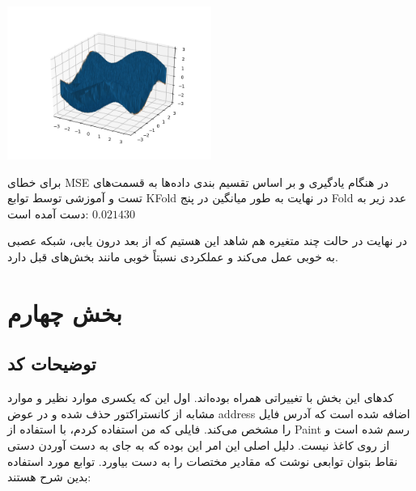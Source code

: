 \documentclass[12pt,titlepage,a4page , tikz , multi,table , svgnames,xcdraw]{article}
\begin{document}
\begin{center}

 \includegraphics[width=0.5\textwidth]{pictures/14.png}

\end{center}

برای خطای MSE در هنگام یادگیری و بر اساس تقسیم بندی داده‌ها به قسمت‌های تست و آموزشی توسط توابع KFold در نهایت به طور میانگین در پنج Fold عدد زیر به دست آمده است:
$ 0.021430$


\hrulefill

در نهایت در حالت چند متغیره هم شاهد این هستیم که از بعد درون یابی، شبکه عصبی به خوبی عمل می‌کند و عملکردی نسبتاً خوبی مانند بخش‌های قبل دارد.


\newpage

\section{بخش چهارم}
\subsection{توضیحات کد}
کدهای این بخش با تغییراتی همراه بوده‌اند. اول این که یکسری موارد نظیر  و موارد مشابه از کانستراکتور حذف شده و در عوض address اضافه شده است که آدرس فایل را مشخص می‌کند. فایلی که من استفاده کردم، با استفاده از Paint رسم شده است و از روی کاغذ نیست. دلیل اصلی این امر این بوده که به جای به دست آوردن دستی نقاط بتوان توابعی نوشت که مقادیر مختصات را به دست بیاورد. توابع مورد استفاده بدین شرح هستند:
\end{document}

